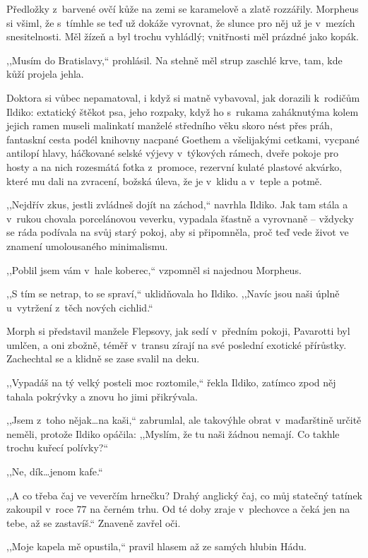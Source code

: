 Předložky z barvené ovčí kůže na zemi se karamelově a zlatě rozzářily. Morpheus si všiml, že s tímhle se teď už dokáže vyrovnat, že slunce pro něj už je v mezích snesitelnosti. Měl žízeň a byl trochu vyhládlý; vnitřnosti měl prázdné jako kopák.

,,Musím do Bratislavy,`` prohlásil. Na stehně měl strup zaschlé krve, tam, kde kůží projela jehla.

Doktora si vůbec nepamatoval, i když si matně vybavoval, jak dorazili k rodičům Ildiko: extatický štěkot psa, jeho rozpaky, když ho s rukama zaháknutýma kolem jejich ramen museli malinkatí manželé středního věku skoro nést přes práh, fantaskní cesta podél knihovny nacpané Goethem a všelijakými cetkami, vycpané antilopí hlavy, háčkované selské výjevy v týkových rámech, dveře pokoje pro hosty a na nich rozesmátá fotka z promoce, rezervní kulaté plastové akvárko, které mu dali na zvracení, božská úleva, že je v klidu a v teple a potmě.

,,Nejdřív zkus, jestli zvládneš dojít na záchod,`` navrhla Ildiko. Jak tam stála a v rukou chovala porcelánovou veverku, vypadala šťastně a vyrovnaně -- vždycky se ráda podívala na svůj starý pokoj, aby si připomněla, proč teď vede život ve znamení umolousaného minimalismu.

,,Poblil jsem vám v hale koberec,`` vzpomněl si najednou Morpheus.

,,S tím se netrap, to se spraví,`` uklidňovala ho Ildiko. ,,Navíc jsou naši úplně u~vytržení z těch nových cichlid.``

Morph si představil manžele Flepsovy, jak sedí v předním pokoji, Pavarotti byl umlčen, a oni zbožně, téměř v transu zírají na své poslední exotické přírůstky. Zachechtal se a klidně se zase svalil na deku.

,,Vypadáš na tý velký posteli moc roztomile,`` řekla Ildiko, zatímco zpod něj tahala pokrývky a znovu ho jimi přikrývala.

,,Jsem z toho nějak\ldots na kaši,`` zabrumlal, ale takovýhle obrat v maďarštině určitě neměli, protože Ildiko opáčila: ,,Myslím, že tu naši žádnou nemají. Co takhle trochu kuřecí polívky?``

,,Ne, dík\ldots jenom kafe.``

,,A co třeba čaj ve veverčím hrnečku? Drahý anglický čaj, co můj statečný tatínek zakoupil v roce 77 na černém trhu. Od té doby zraje v plechovce a čeká jen na tebe, až se zastavíš.``
Znaveně zavřel oči. 

,,Moje kapela mě opustila,`` pravil hlasem až ze samých hlubin Hádu.


